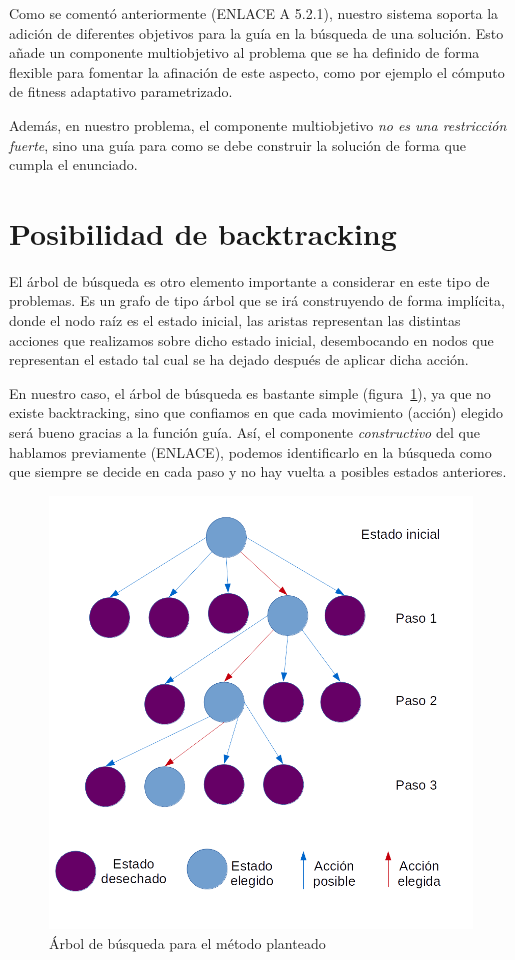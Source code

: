 Como se comentó anteriormente (ENLACE A 5.2.1), nuestro sistema soporta la adición de diferentes objetivos para la guía en la búsqueda de una solución. Esto añade un componente multiobjetivo al problema que se ha definido de forma flexible para fomentar la afinación de este aspecto, como por ejemplo el cómputo de fitness adaptativo parametrizado.

Además, en nuestro problema, el componente multiobjetivo \emph{no es una restricción fuerte}, sino una guía para como se debe construir la solución de forma que cumpla el enunciado.

\section{Posibilidad de backtracking}

El árbol de búsqueda es otro elemento importante a considerar en este tipo de problemas. Es un grafo de tipo árbol que se irá construyendo de forma implícita, donde el nodo raíz es el estado inicial, las aristas representan las distintas acciones que realizamos sobre dicho estado inicial, desembocando en nodos que representan el estado tal cual se ha dejado después de aplicar dicha acción.

En nuestro caso, el árbol de búsqueda es bastante simple (figura~\ref{fig:searchtree}), ya que no existe backtracking, sino que confiamos en que cada movimiento (acción) elegido será bueno gracias a la función guía. Así, el componente \emph{constructivo} del que hablamos previamente (ENLACE), podemos identificarlo en la búsqueda como que siempre se decide en cada paso y no hay vuelta a posibles estados anteriores.

\begin{figure}[t]
\centering
\includegraphics[scale=0.5]{img/arbol-busqueda}
\caption{Árbol de búsqueda para el método planteado
\label{fig:searchtree}}
\end{figure}


